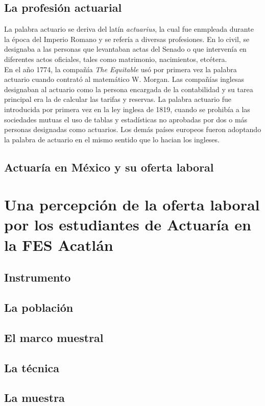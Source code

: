 \documentclass[a4paper]{article}
\begin{document}
\subsection{La profesión actuarial}
La palabra actuario se deriva del latín \textit{actuarius}, la cual fue enmpleada durante la época del Imperio Romano y se refería a diversas profesiones. En lo civil, se designaba a las personas que levantaban actas del Senado o que intervenía en diferentes actos oficiales, tales como matrimonio, nacimientos, etcétera.\\

En el año 1774, la compañía \textit{The Equitable} usó por primera vez la palabra actuario cuando contrató al matemático W. Morgan. Las compañías inglesas designaban al actuario como la persona encargada de la contabilidad y su tarea principal era la de calcular las tarifas y reservas. La palabra actuario fue introducida por primera vez en la ley inglesa de 1819, cuando se prohibía a las sociedades mutuas el uso de tablas y estadísticas no aprobadas por dos o más personas designadas como actuarios. Los demás países europeos fueron adoptando la palabra de actuario en el mismo sentido que lo hacian los ingleses.

\subsection{Actuaría en México y su oferta laboral}

\section{Una percepción de la oferta laboral por los estudiantes de Actuaría en la FES Acatlán}

\subsection{Instrumento}
\subsection{La población}
\subsection{El marco muestral}
\subsection{La técnica}
\subsection{La muestra}
\end{document}
